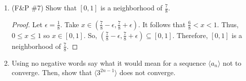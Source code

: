 \documentclass{article}
\theoremstyle{problem}
\theoremstyle{plain}
\theoremstyle{remark}
\begin{document}
\begin{enumerate}
\item (F\&P \#7) Show that $[0,1]$ is a neighborhood of $\frac{7}{8}$.
  \begin{proof}
    Let $\epsilon = \frac{1}{8}$. 
    Take $x \in (\frac{7}{8} - \epsilon, \frac{7}{8} + \epsilon)$.
    It follows that $ \frac{6}{8} < x < 1$. 
    Thus, $0 \leq x \leq 1$ so $x \in [0,1]$.
    So, $(\frac{7}{8} - \epsilon, \frac{7}{8} + \epsilon) \subseteq [0,1]$.
    Therefore, $[0,1]$ is a neighborhood of $\frac{7}{8}$.
  \end{proof}
\item Using no negative words say what it would mean for a sequence $\langle a_n \rangle$ not to converge. Then, show that $\langle 3^{2n-1} \rangle$ does not converge.\\







\end{enumerate}
\end{document}
